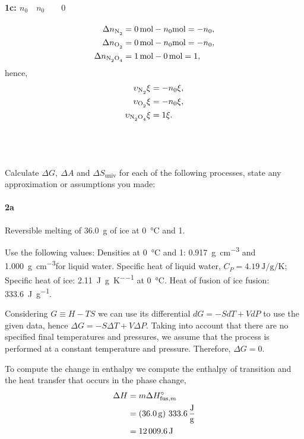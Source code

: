 \documentclass[main.tex]{subfiles}
\begin{document}
\paragraph{1c: $n_0 \quad n_0 \qquad 0$}
\begin{align*}
    \Delta n_{\ce{N2}} &= \SI{0}{\mole} - n_0\SI{}{\mole} = -n_0, \\
    \Delta n_{\ce{O2}} &= \SI{0}{\mole} - n_0\SI{}{\mole} = -n_0, \\
    \Delta n_{\ce{N2O4}} &= \SI{1}{\mole} - \SI{0}{\mole} = 1,
\end{align*}
hence,
\begin{align*}
    \upsilon_{\ce{N2}}\xi &= -n_0\xi, \\
    \upsilon_{\ce{O2}}\xi &= -n_0\xi, \\
    \upsilon_{\ce{N2O4}}\xi &= 1\xi.
\end{align*}


\subsection{~}
Calculate $\Delta G,~\Delta A$ and $\Delta S_{\mathrm{univ}}$ for each of the following processes, state any approximation or assumptions you made:

\paragraph{2a} Reversible melting of \SI{36.0}{\gram} of ice at \SI{0}{\celsius} and \SI{1}{\atm}.

Use the following values:
Densities at \SI{0}{\celsius} and \SI{1}{\atm}: \SI{0.917}{\gram\per\centi\meter\tothe{3}} and \SI{1.000}{\gram\per\centi\meter\tothe{3}}for liquid water.
Specific heat of liquid water, $C_P=\SI{4.19}{\joule\per\gram\per\kelvin}$; Specific heat of ice: \SI{2.11}{\joule\per\gram\per\kelvin} at \SI{0}{\celsius}.
Heat of fusion of ice fusion: \SI{333.6}{\joule\per\gram}.

Considering $G\equiv H-TS$ we can use its differential $dG = -SdT + VdP$ to use the given data, hence $\Delta G = -S\Delta T + V\Delta P$.
Taking into account that there are no specified final temperatures and pressures, we assume that the process is performed at a constant temperature and pressure.
Therefore, $\Delta G = 0$.

To compute the change in enthalpy we compute the enthalpy of transition and the heat transfer that occurs in the phase change,
\begin{align*}
    \Delta H &= m\Delta H_{\mathrm{fus},m}^{\circ} \\
    &= \qty(\SI{36.0}{\gram})~\SI[per-mode=fraction]{333.6}{\joule\per\gram} \\
    &= \SI{12009.6}{\joule}
\end{align*}
\end{document}
